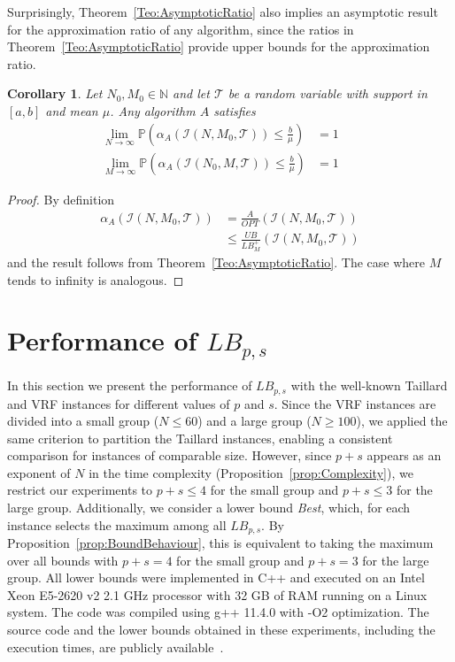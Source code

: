 \documentclass{article}
\theoremstyle{thmstyleone}%
\newtheorem{corollary}[theorem]{Corollary}%
\theoremstyle{thmstyletwo}%
\theoremstyle{thmstylethree}%
\begin{document}
Surprisingly, Theorem~\ref{Teo:AsymptoticRatio} also implies an asymptotic result for the approximation ratio of any algorithm, since the ratios in Theorem~\ref{Teo:AsymptoticRatio} provide upper bounds for the approximation ratio. 

\begin{corollary}
Let $N_0, M_0 \in \mathbb{N}$ and let $\mathcal{T}$ be a random variable with support in $[a,b]$ and mean $\mu$. Any algorithm $A$ satisfies 
\begin{align}
\lim_{N \to \infty} \mathbb{P} \left( \alpha_A( \mathcal{I}(N, M_0, \mathcal{T}) ) \leq \frac{b}{\mu} \right) &= 1 && \label{AlgApprox:Ninf}\\
\lim_{M \to \infty} \mathbb{P} \left( \alpha_A( \mathcal{I}(N_0, M, \mathcal{T}) ) \leq \frac{b}{\mu} \right) &= 1  && \label{AlgApprox:Minf}
\end{align}
\end{corollary}
\begin{proof}
By definition
\begin{align*}
    \alpha_A( \mathcal{I}(N, M_0, \mathcal{T}) ) &= \frac{A}{OPT}(\mathcal{I}(N, M_0, \mathcal{T}))\\
    &\leq \frac{UB}{LB_M^+}(\mathcal{I}(N, M_0, \mathcal{T}))
\end{align*}
and the result follows from Theorem~\ref{Teo:AsymptoticRatio}. The case where $M$ tends to infinity is analogous. 
\end{proof}



\section{Performance of $LB_{p,s}$}
\label{section:PerformanceLB}

In this section we present the performance of $LB_{p,s}$ with the well-known Taillard and VRF instances for different values of $p$ and $s$. 
Since the VRF instances are divided into a small group ($N \leq 60$) and a large group ($N \geq 100$), we applied the same criterion to partition the Taillard instances, enabling a consistent comparison for instances of comparable size. 
However, since $p + s$ appears as an exponent of $N$ in the time complexity (Proposition~\ref{prop:Complexity}), we restrict our experiments to $p + s \le 4$ for the small group and $p + s \leq 3$ for the large group. 
Additionally, we consider a lower bound \textit{Best}, which, for each instance selects the maximum among all $LB_{p,s}$. 
By Proposition~\ref{prop:BoundBehaviour}, this is equivalent to taking the maximum over all bounds with $p + s = 4$ for the small group and $p + s = 3$ for the large group. 
All lower bounds were implemented in C++ 
and executed on an Intel Xeon E5-2620 v2 2.1 GHz processor with 32 GB of RAM running on a Linux system. The code was compiled using g++ 11.4.0 with -O2 optimization. 
The source code and the lower bounds obtained in these experiments, including the execution times, are publicly available~\cite{SourceCode}. 
\end{document}
